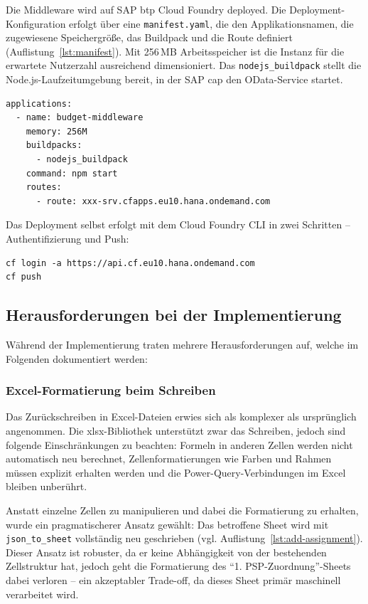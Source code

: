 Die Middleware wird auf SAP \gls{btp} Cloud Foundry deployed. Die Deployment-Konfiguration erfolgt über eine \texttt{manifest.yaml}, die den Applikationsnamen, die zugewiesene Speichergröße, das Buildpack und die Route definiert (Auflistung~\ref{lst:manifest}). Mit 256\,MB Arbeitsspeicher ist die Instanz für die erwartete Nutzerzahl ausreichend dimensioniert. Das \texttt{nodejs\_buildpack} stellt die Node.js-Laufzeitumgebung bereit, in der SAP \gls{cap} den OData-Service startet.

\begin{lstlisting}[caption={manifest.yaml}, label={lst:manifest}]
applications:
  - name: budget-middleware
    memory: 256M
    buildpacks:
      - nodejs_buildpack
    command: npm start
    routes:
      - route: xxx-srv.cfapps.eu10.hana.ondemand.com
\end{lstlisting}

Das Deployment selbst erfolgt mit dem Cloud Foundry CLI in zwei Schritten -- Authentifizierung und Push:

\begin{lstlisting}[caption={Deployment-Befehle}, label={lst:deploy}]
cf login -a https://api.cf.eu10.hana.ondemand.com
cf push
\end{lstlisting}

\subsection{Herausforderungen bei der Implementierung}

Während der Implementierung traten mehrere Herausforderungen auf, welche im Folgenden dokumentiert werden:

\subsubsection{Excel-Formatierung beim Schreiben}

Das Zurückschreiben in Excel-Dateien erwies sich als komplexer als ursprünglich angenommen. Die xlsx-Bibliothek unterstützt zwar das Schreiben, jedoch sind folgende Einschränkungen zu beachten: Formeln in anderen Zellen werden nicht automatisch neu berechnet, Zellenformatierungen wie Farben und Rahmen müssen explizit erhalten werden und die Power-Query-Verbindungen im Excel bleiben unberührt.

Anstatt einzelne Zellen zu manipulieren und dabei die Formatierung zu erhalten, wurde ein pragmatischerer Ansatz gewählt: Das betroffene Sheet wird mit \texttt{json\_to\_sheet} vollständig neu geschrieben (vgl. Auflistung~\ref{lst:add-assignment}). Dieser Ansatz ist robuster, da er keine Abhängigkeit von der bestehenden Zellstruktur hat, jedoch geht die Formatierung des \enquote{1. PSP-Zuordnung}-Sheets dabei verloren -- ein akzeptabler Trade-off, da dieses Sheet primär maschinell verarbeitet wird.

